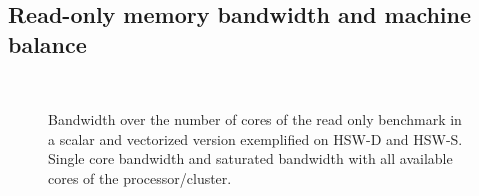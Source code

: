 \subsection{Read-only memory bandwidth and machine balance}
\label{sec:tb:membw}

\begin{figure}[!t]%
  \centering%
  \captionsetup[subfigure]{farskip=0pt}%
   \, \hspace{0.5cm}
  \caption{\protect{} Bandwidth over the number of cores of the read only benchmark in a
scalar and vectorized version exemplified on HSW-D and
HSW-S.
\protect\linebreak
\protect{} Single core bandwidth and saturated bandwidth with all available cores of the
processor/cluster.}
  \label{fig:mrm:bw}
\end{figure}


